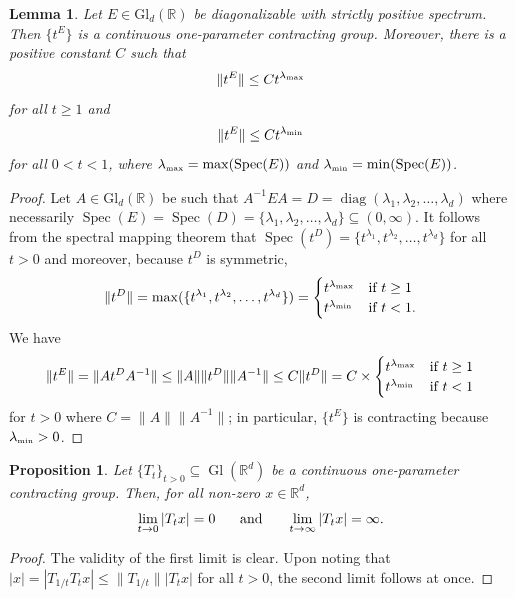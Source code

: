 \documentclass[11pt, letter]{book}
\newtheorem{lemma}[theorem]{Lemma}
\newtheorem{proposition}[theorem]{Proposition}
\newcommand\GldR{\mbox{Gl}_d(\mathbb{R})}%
\newcommand\Gl{\operatorname{Gl}} %
\newcommand\diag{\operatorname{diag}}
\newcommand\Spec{\operatorname{Spec}}
\begin{document}
\begin{lemma}\label{lem:SpectralEstimateforContractingGroup}
Let $E\in\GldR$ be diagonalizable with strictly positive spectrum. Then $\{t^E\}$ is a continuous one-parameter contracting group. Moreover, there is a positive constant $C$ such that
\begin{equation*}
\|t^E\|\leq Ct^{\lambda_{\mbox{\tiny{max}}}}
\end{equation*}
for all $t\geq 1$ and
\begin{equation*}
\|t^E\|\leq Ct^{\lambda_{\mbox{\tiny{min}}}}
\end{equation*}
for all $0<t<1$, where $\lambda_{\mbox{\tiny{max}}}=\max(\Spec(E))$ and $\lambda_{\mbox{\tiny{min}}}=\min(\Spec(E))$.
\end{lemma}
\begin{proof}
Let $A\in\GldR$ be such that $A^{-1}EA=D=\diag(\lambda_1,\lambda_2,\dots,\lambda_d)$ where necessarily $\Spec(E)=\Spec(D)=\{\lambda_1,\lambda_2,\dots,\lambda_d\}\subseteq (0,\infty)$. It follows from the spectral mapping theorem that $\Spec(t^D)=\{t^{\lambda_1},t^{\lambda_2},\dots,t^{\lambda_d}\}$ for all $t>0$ and moreover, because $t^D$ is symmetric,
\begin{equation*}
\|t^D\| = \max(\{t^{\lambda_1},t^{\lambda_2},\dots,t^{\lambda_d}\})
=\begin{cases}
t^{\lambda_{\mbox{\tiny{max}}}} & \mbox{if }t\geq 1\\
t^{\lambda_{\mbox{\tiny{min}}}} & \mbox{if }t<1.
\end{cases}
\end{equation*}
We have
\begin{equation*}
\|t^E\|=\|At^DA^{-1}\|\leq \|A\|\|t^D\|\|A^{-1}\|\leq C\|t^D\|=C\times
\begin{cases}
t^{\lambda_{\mbox{\tiny{max}}}} & \mbox{if }t\geq 1\\
t^{\lambda_{\mbox{\tiny{min}}}} & \mbox{if }t<1
\end{cases}
\end{equation*}
for $t>0$ where $C=\|A\|\|A^{-1}\|$; in particular, $\{t^E\}$ is contracting because $\lambda_{\mbox{\tiny{min}}}>0$.
\end{proof}


\begin{proposition}\label{prop:ContractingLimits}
Let $\{T_t\}_{t>0}\subseteq\Gl(\mathbb{R}^d)$ be a continuous one-parameter contracting group.  Then, for all non-zero $x\in\mathbb{R}^d$,
\begin{equation*}
\lim_{t\rightarrow 0}|T_t x|=0\hspace{.5cm}\mbox{ and }\hspace{.5cm}\lim_{t\rightarrow\infty}|T_t x|=\infty.
\end{equation*}
\end{proposition}
\begin{proof}
The validity of the first limit is clear. Upon noting that $|x|=|T_{1/t}T_tx|\leq \|T_{1/t}\||T_t x|$ for all $t>0$, the second limit follows at once.
\end{proof}
\end{document}
